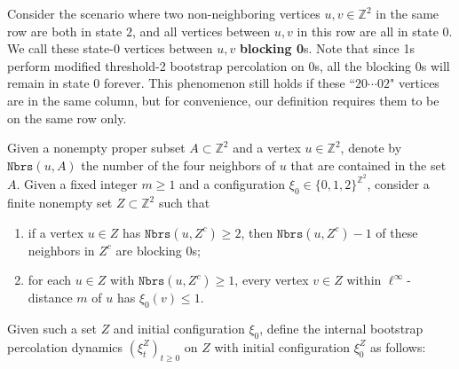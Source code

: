 \documentclass{article}
\newcommand{\bZ}{{\mathbb Z}}
\numberwithin{equation}{section}
\begin{document}
Consider the scenario where two non-neighboring vertices $u, v \in \bZ^2$ in the same row are both in state $2$, and all vertices between $u, v$ in this row are all in state $0$.
We call these state-0 vertices between $u, v$ \textbf{blocking 0}s.
Note that since 1s perform modified threshold-2 bootstrap percolation on 0s, all the blocking 0s will remain in state 0 forever.
This phenomenon still holds if these ``$20\cdots 02$" vertices are in the same column, but for convenience, our definition requires them to be on the same row only.  

Given a nonempty proper subset $A \subset \bZ^2$ and a vertex $u \in \bZ^2$, denote by $\texttt{Nbrs}(u, A)$ the number of the four neighbors of $u$ that are contained in the set $A$.
Given a fixed integer $m \geq 1$ and a configuration $\xi_0 \in \{0,1,2\}^{\bZ^2}$, consider a finite nonempty set $Z \subset \bZ^2$ such that
\begin{enumerate}[leftmargin=1.25cm]
    \item[(PR1)]
    if a vertex $u \in Z$ has $\texttt{Nbrs}(u, Z^c) \geq 2$, then $\texttt{Nbrs}(u, Z^c) - 1$ of these neighbors in $Z^c$ are blocking 0s;
    
    \item[(PR2)]
    for each $u \in Z$ with $\texttt{Nbrs}(u, Z^c) \geq 1$, every vertex $v \in Z$ within $\ell^\infty$-distance $m$ of $u$ has $\xi_0(v) \leq 1$.
\end{enumerate}
Given such a set $Z$ and initial configuration $\xi_0$,
define the internal bootstrap percolation dynamics 
$(\xi_t^Z)_{t \geq 0}$ on $Z$ with initial configuration $\xi_0^Z$ as follows:
\end{document}
